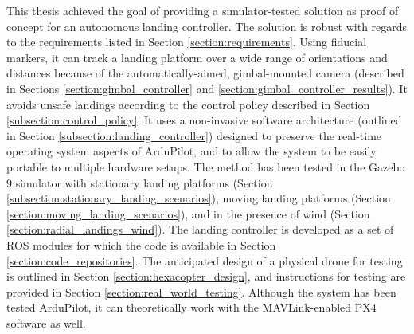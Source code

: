 This thesis achieved the goal of providing a simulator-tested solution as proof of concept for an autonomous landing controller. The solution is robust with regards to the requirements listed in Section \ref{section:requirements}. Using fiducial markers, it can track a landing platform over a wide range of orientations and distances because of the automatically-aimed, gimbal-mounted camera (described in Sections \ref{section:gimbal_controller} and \ref{section:gimbal_controller_results}). It avoids unsafe landings according to the control policy described in Section \ref{subsection:control_policy}. It uses a non-invasive software architecture (outlined in Section \ref{subsection:landing_controller}) designed to preserve the real-time operating system aspects of ArduPilot, and to allow the system to be easily portable to multiple hardware setups. The method has been tested in the Gazebo 9 simulator with stationary landing platforms (Section \ref{subsection:stationary_landing_scenarios}), moving landing platforms (Section \ref{section:moving_landing_scenarios}), and in the presence of wind (Section \ref{section:radial_landings_wind}). The landing controller is developed as a set of \gls{ROS} modules for which the code is available in Section \ref{section:code_repositories}. The anticipated design of a physical drone for testing is outlined in Section \ref{section:hexacopter_design}, and instructions for testing are provided in Section \ref{section:real_world_testing}. Although the system has been tested ArduPilot, it can theoretically work with the MAVLink-enabled PX4 software as well.